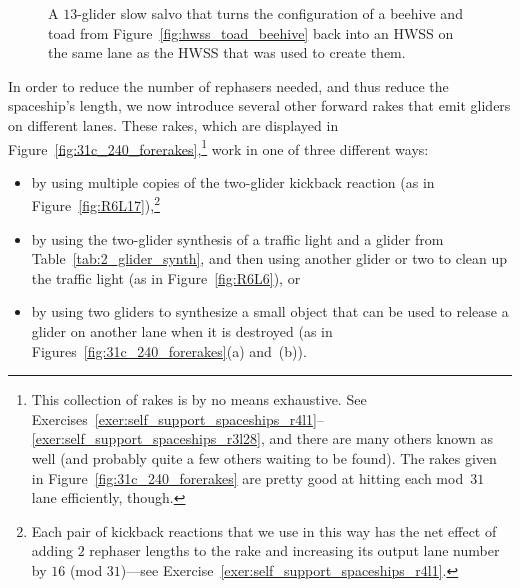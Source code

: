 \begin{figure}[!htb]
	\centering{} 
	\caption{A $13$-glider slow salvo that turns the configuration of a beehive and toad from Figure~\ref{fig:hwss_toad_beehive} back into an HWSS on the same lane as the HWSS that was used to create them.}\label{fig:hwss_from_toad_beehive}
\end{figure}

In order to reduce the number of rephasers needed, and thus reduce the spaceship's length, we now introduce several other forward rakes that emit gliders on different lanes. These rakes, which are displayed in Figure~\ref{fig:31c_240_forerakes},\footnote{This collection of rakes is by no means exhaustive. See Exercises~\ref{exer:self_support_spaceships_r4l1}--\ref{exer:self_support_spaceships_r3l28}, and there are many others known as well (and probably quite a few others waiting to be found). The rakes given in Figure~\ref{fig:31c_240_forerakes} are pretty good at hitting each mod~$31$ lane efficiently, though.} work in one of three different ways:\smallskip

\begin{itemize}
	\item by using multiple copies of the two-glider kickback reaction (as in Figure~\ref{fig:R6L17}),\footnote{Each pair of kickback reactions that we use in this way has the net effect of adding $2$ rephaser lengths to the rake and increasing its output lane number by $16$ (mod $31$)---see Exercise~\ref{exer:self_support_spaceships_r4l1}.}\smallskip
	
	\item by using the two-glider synthesis of a traffic light and a glider from Table~\ref{tab:2_glider_synth}, and then using another glider or two to clean up the traffic light (as in Figure~\ref{fig:R6L6}), or\smallskip
	
	\item by using two gliders to synthesize a small object that can be used to release a glider on another lane when it is destroyed (as in Figures~\ref{fig:31c_240_forerakes}(a) and~(b)).\smallskip
\end{itemize}

